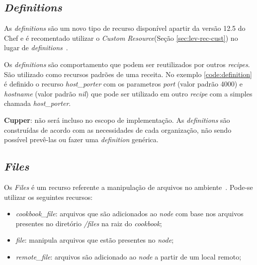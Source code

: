 \subsection{\textit{Definitions}}
\label{sec:lev-rec-def}

As \textit{definitions} são um novo tipo de recurso disponível apartir da versão
12.5 do Chef e é recomentado utilizar o \textit{Custom Resource}(Seção \ref{sec:lev-rec-cust})
no lugar de \textit{definitions}~\cite{chefdoc:2016}.

Os \textit{definitions} são comportamento que podem ser reutilizados por outros \textit{recipes}.
São utilizado como recursos padrões de uma receita. No exemplo \ref{code:definition}
é definido o recurso \textit{host\_porter} com os parametros \textit{port} (valor padrão 4000)
e \textit{hostname} (valor padrão \textit{nil}) que pode ser utilizado em outro
\textit{recipe} com a simples chamada \textit{host\_porter}.

\begin{minipage}{.90\textwidth}
  \lstset{style=shell}
  
\end{minipage}

\textbf{Cupper}: não será incluso no escopo de implementação. As \textit{definitions} são
construídas de acordo com as necessidades de cada organização, não sendo
possível prevê-las ou fazer uma \textit{definition} genérica.

\subsection{\textit{Files}}
\label{sec:cbfiles}

Os \textit{Files} é um recurso referente a manipulação de arquivos no ambiente~\cite{chefdoc:2016}.
Pode-se utilizar os seguintes recursos:

\begin{itemize}
  \item \textit{cookbook\_file}: arquivos que são adicionados ao \textit{node} com base
    nos arquivos presentes no diretório \textit{/files} na raiz do \textit{cookbook};
  \item \textit{file}: manipula arquivos que estão presentes no \textit{node};
  \item \textit{remote\_file}: arquivos são adicionado ao \textit{node} a partir de um
    local remoto;
\end{itemize}

